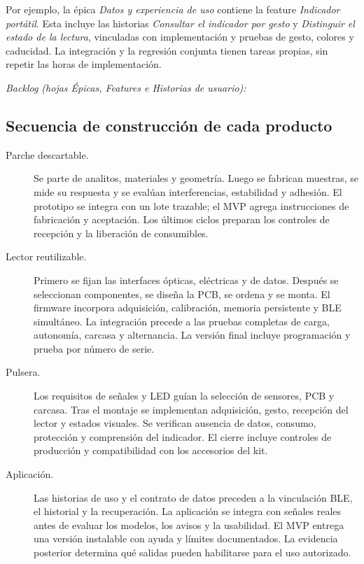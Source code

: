 Por ejemplo, la épica \textit{Datos y experiencia de uso} contiene la feature \textit{Indicador portátil}. Esta incluye las historias \textit{Consultar el indicador por gesto} y \textit{Distinguir el estado de la lectura}, vinculadas con implementación y pruebas de gesto, colores y caducidad. La integración y la regresión conjunta tienen tareas propias, sin repetir las horas de implementación.
\par\noindent\textit{Backlog (hojas Épicas, Features e Historias de usuario):} 

\subsection{Secuencia de construcción de cada producto}
\begin{description}
\item[Parche descartable.] Se parte de analitos, materiales y geometría. Luego se fabrican muestras, se mide su respuesta y se evalúan interferencias, estabilidad y adhesión. El prototipo se integra con un lote trazable; el MVP agrega instrucciones de fabricación y aceptación. Los últimos ciclos preparan los controles de recepción y la liberación de consumibles.
\item[Lector reutilizable.] Primero se fijan las interfaces ópticas, eléctricas y de datos. Después se seleccionan componentes, se diseña la PCB, se ordena y se monta. El firmware incorpora adquisición, calibración, memoria persistente y BLE simultáneo. La integración precede a las pruebas completas de carga, autonomía, carcasa y alternancia. La versión final incluye programación y prueba por número de serie.
\item[Pulsera.] Los requisitos de señales y LED guían la selección de sensores, PCB y carcasa. Tras el montaje se implementan adquisición, gesto, recepción del lector y estados visuales. Se verifican ausencia de datos, consumo, protección y comprensión del indicador. El cierre incluye controles de producción y compatibilidad con los accesorios del kit.
\item[Aplicación.] Las historias de uso y el contrato de datos preceden a la vinculación BLE, el historial y la recuperación. La aplicación se integra con señales reales antes de evaluar los modelos, los avisos y la usabilidad. El MVP entrega una versión instalable con ayuda y límites documentados. La evidencia posterior determina qué salidas pueden habilitarse para el uso autorizado.
\end{description}

